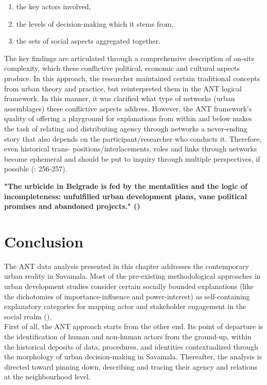 \documentclass[11pt]{report}
\begin{document}
\begin{enumerate}
\item the key actors involved,
\item the levels of decision-making which it stems from,
\item the sets of social aspects aggregated together.
\end{enumerate}

The key findings are articulated through a comprehensive description of on-site complexity, which these conflictive political, economic and cultural aspects produce. In this approach, the researcher maintained certain traditional concepts from urban theory and practice, but reinterpreted them in the ANT logical framework. In this manner, it was clarified what type of networks (urban assemblages) these conflictive aspects address. However, the ANT framework’s quality of offering a playground for explanations from within and below makes the task of relating and distributing agency through networks a never-ending story that also depends on the participant/researcher who conducts it. Therefore, even historical trans- positions/interlacements, roles and links through networks become ephemeral and should be put to inquiry through multiple perspectives, if possible  (\href{Latour}{\citealt{latour_reassembling_2005}}: 256-257).

\textbf{"The  urbicide  in  Belgrade  is  fed  by  the  mentalities and  the  logic  of  incompleteness:  unfulfilled  urban development  plans,  vane  political  promises  and abandoned  projects." (\href{Doytchinov}{\citealt{doytchinov_belgrade_2015}})}

\section{Conclusion}

The ANT data analysis presented in this chapter addresses the contemporary urban reality in Savamala.
Most of the pre-existing methodological approaches in urban development studies consider certain socially bounded explanations (like the dichotomies of importance-influence and power-interest) as self-containing explanatory categories for mapping actor and stakeholder engagement in the social realm (\href{Mathur}{\citealt{mathur_defining_2007}}).
\\

First of all, the ANT approach starts from the other end.
Its point of departure is the identification of human and non-human actors from the ground-up, within the historical deposits of data, procedures, and identities contextualized through the morphology of urban decision-making in Savamala.
Thereafter, the analysis is directed toward pinning down, describing and tracing  their agency and relations at the neighbourhood level.
\\
\end{document}
